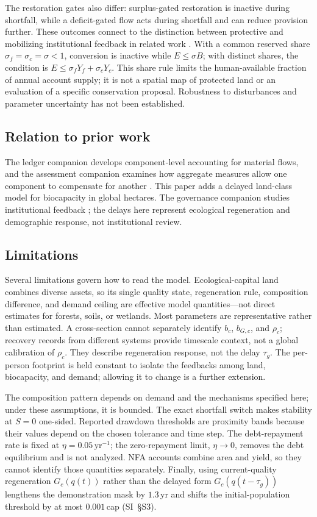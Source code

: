 \documentclass[preprint,12pt,authoryear]{elsarticle}
\begin{document}
The restoration gates also differ: surplus-gated restoration is inactive during shortfall, while a deficit-gated flow acts during shortfall and can reduce provision further. These outcomes connect to the distinction between protective and mobilizing institutional feedback in related work \citep{Abaee2026a}. With a common reserved share $\sigma_f=\sigma_c=\sigma<1$, conversion is inactive while $E\le\sigma B$; with distinct shares, the condition is $E\le\sigma_fY_f+\sigma_cY_c$. This share rule limits the human-available fraction of annual account supply; it is not a spatial map of protected land or an evaluation of a specific conservation proposal. Robustness to disturbances and parameter uncertainty has not been established.

\subsection{Relation to prior work}

The ledger companion develops component-level accounting for material flows, and the assessment companion examines how aggregate measures allow one component to compensate for another \citep{Abaee2026b,Abaee2026c}. This paper adds a delayed land-class model for biocapacity in global hectares. The governance companion studies institutional feedback \citep{Abaee2026a}; the delays here represent ecological regeneration and demographic response, not institutional review.

\subsection{Limitations}

Several limitations govern how to read the model. Ecological-capital land combines diverse assets, so its single quality state, regeneration rule, composition difference, and demand ceiling are effective model quantities—not direct estimates for forests, soils, or wetlands. Most parameters are representative rather than estimated. A cross-section cannot separately identify $b_c$, $b_{G,c}$, and $\rho_c$; recovery records from different systems provide timescale context, not a global calibration of $\rho_c$. They describe regeneration response, not the delay $\tau_g$. The per-person footprint is held constant to isolate the feedbacks among land, biocapacity, and demand; allowing it to change is a further extension.

The composition pattern depends on demand and the mechanisms specified here; under these assumptions, it is bounded. The exact shortfall switch makes stability at $S=0$ one-sided. Reported drawdown thresholds are proximity bands because their values depend on the chosen tolerance and time step. The debt-repayment rate is fixed at $\eta=0.05$\,yr$^{-1}$; the zero-repayment limit, $\eta\to0$, removes the debt equilibrium and is not analyzed. NFA accounts combine area and yield, so they cannot identify those quantities separately. Finally, using current-quality regeneration $G_c(q(t))$ rather than the delayed form $G_c(q(t-\tau_g))$ lengthens the demonstration mask by $1.3$\,yr and shifts the initial-population threshold by at most $0.001$\,cap (SI~\S S3).
\end{document}

